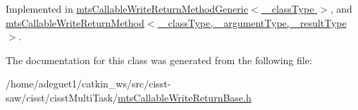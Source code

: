 Implemented in \hyperlink{classmts_callable_write_return_method_generic_ae99bbbfb944bf164dfa90df630a31263}{mts\-Callable\-Write\-Return\-Method\-Generic$<$ \-\_\-class\-Type $>$}, and \hyperlink{classmts_callable_write_return_method_a5b79eed629e5634a62de1a6056571686}{mts\-Callable\-Write\-Return\-Method$<$ \-\_\-class\-Type, \-\_\-argument\-Type, \-\_\-result\-Type $>$}.



The documentation for this class was generated from the following file\-:\begin{DoxyCompactItemize}
\item 
/home/adeguet1/catkin\-\_\-ws/src/cisst-\/saw/cisst/cisst\-Multi\-Task/\hyperlink{mts_callable_write_return_base_8h}{mts\-Callable\-Write\-Return\-Base.\-h}\end{DoxyCompactItemize}
